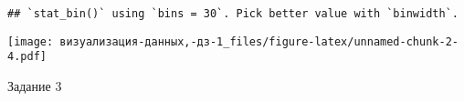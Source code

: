 \documentclass[
]{article}
\newenvironment{Shaded}{\begin{snugshade}}{\end{snugshade}}
\newcommand{\DecValTok}[1]{\textcolor[rgb]{0.00,0.00,0.81}{#1}}
\newcommand{\FunctionTok}[1]{\textcolor[rgb]{0.00,0.00,0.00}{#1}}
\newcommand{\NormalTok}[1]{#1}
\newcommand{\OtherTok}[1]{\textcolor[rgb]{0.56,0.35,0.01}{#1}}
\newcommand{\SpecialCharTok}[1]{\textcolor[rgb]{0.00,0.00,0.00}{#1}}
\begin{document}
\begin{verbatim}
## `stat_bin()` using `bins = 30`. Pick better value with `binwidth`.
\end{verbatim}

\texttt{[image: визуализация-данных,-дз-1\_files/figure-latex/unnamed-chunk-2-4.pdf]}

Задание 3

\begin{Shaded}
\end{Shaded}
\end{document}
